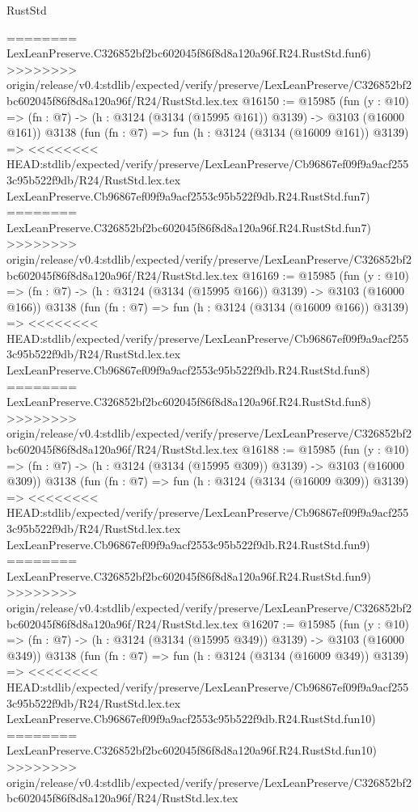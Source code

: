 \begin{lexlean}{RustStd}
\begin{coremodule}
{\begin{coremodule}
{{{{{{{{{{{{{{{{{{{{{{{{{{========
    LexLeanPreserve.C326852bf2bc602045f86f8d8a120a96f.R24.RustStd.fun6)
>>>>>>>> origin/release/v0.4:stdlib/expected/verify/preserve/LexLeanPreserve/C326852bf2bc602045f86f8d8a120a96f/R24/RustStd.lex.tex
@16150 := @15985
    (fun (y : @10) => (fn : @7) -> (h : @3124 (@3134 (@15995 @161)) @3139) -> @3103 (@16000 @161))
    @3138
    (fun (fn : @7) =>
    fun (h : @3124 (@3134 (@16009 @161)) @3139) =>
<<<<<<<< HEAD:stdlib/expected/verify/preserve/LexLeanPreserve/Cb96867ef09f9a9acf2553c95b522f9db/R24/RustStd.lex.tex
    LexLeanPreserve.Cb96867ef09f9a9acf2553c95b522f9db.R24.RustStd.fun7)
========
    LexLeanPreserve.C326852bf2bc602045f86f8d8a120a96f.R24.RustStd.fun7)
>>>>>>>> origin/release/v0.4:stdlib/expected/verify/preserve/LexLeanPreserve/C326852bf2bc602045f86f8d8a120a96f/R24/RustStd.lex.tex
@16169 := @15985
    (fun (y : @10) => (fn : @7) -> (h : @3124 (@3134 (@15995 @166)) @3139) -> @3103 (@16000 @166))
    @3138
    (fun (fn : @7) =>
    fun (h : @3124 (@3134 (@16009 @166)) @3139) =>
<<<<<<<< HEAD:stdlib/expected/verify/preserve/LexLeanPreserve/Cb96867ef09f9a9acf2553c95b522f9db/R24/RustStd.lex.tex
    LexLeanPreserve.Cb96867ef09f9a9acf2553c95b522f9db.R24.RustStd.fun8)
========
    LexLeanPreserve.C326852bf2bc602045f86f8d8a120a96f.R24.RustStd.fun8)
>>>>>>>> origin/release/v0.4:stdlib/expected/verify/preserve/LexLeanPreserve/C326852bf2bc602045f86f8d8a120a96f/R24/RustStd.lex.tex
@16188 := @15985
    (fun (y : @10) => (fn : @7) -> (h : @3124 (@3134 (@15995 @309)) @3139) -> @3103 (@16000 @309))
    @3138
    (fun (fn : @7) =>
    fun (h : @3124 (@3134 (@16009 @309)) @3139) =>
<<<<<<<< HEAD:stdlib/expected/verify/preserve/LexLeanPreserve/Cb96867ef09f9a9acf2553c95b522f9db/R24/RustStd.lex.tex
    LexLeanPreserve.Cb96867ef09f9a9acf2553c95b522f9db.R24.RustStd.fun9)
========
    LexLeanPreserve.C326852bf2bc602045f86f8d8a120a96f.R24.RustStd.fun9)
>>>>>>>> origin/release/v0.4:stdlib/expected/verify/preserve/LexLeanPreserve/C326852bf2bc602045f86f8d8a120a96f/R24/RustStd.lex.tex
@16207 := @15985
    (fun (y : @10) => (fn : @7) -> (h : @3124 (@3134 (@15995 @349)) @3139) -> @3103 (@16000 @349))
    @3138
    (fun (fn : @7) =>
    fun (h : @3124 (@3134 (@16009 @349)) @3139) =>
<<<<<<<< HEAD:stdlib/expected/verify/preserve/LexLeanPreserve/Cb96867ef09f9a9acf2553c95b522f9db/R24/RustStd.lex.tex
    LexLeanPreserve.Cb96867ef09f9a9acf2553c95b522f9db.R24.RustStd.fun10)
========
    LexLeanPreserve.C326852bf2bc602045f86f8d8a120a96f.R24.RustStd.fun10)
>>>>>>>> origin/release/v0.4:stdlib/expected/verify/preserve/LexLeanPreserve/C326852bf2bc602045f86f8d8a120a96f/R24/RustStd.lex.tex
}}}}}}}}}}}}}}}}}}}}}}}}}}
\end{coremodule}}
\end{coremodule}
\end{lexlean}
